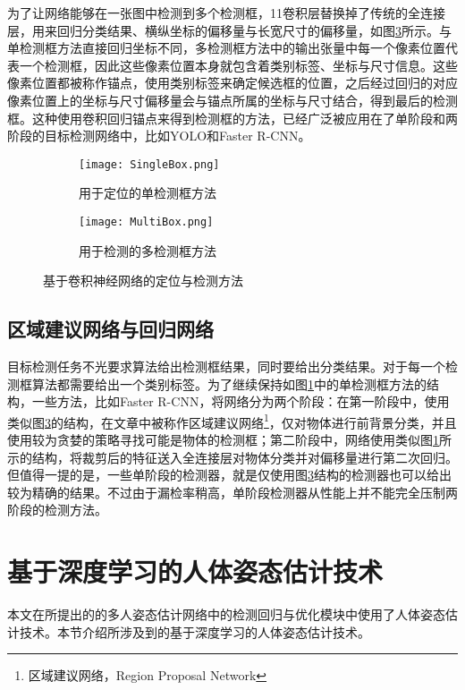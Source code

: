 为了让网络能够在一张图中检测到多个检测框，1\times1卷积层替换掉了传统的全连接层，用来回归分类结果、横纵坐标的偏移量与长宽尺寸的偏移量，如图\ref{fig:MultiBox}所示。与单检测框方法直接回归坐标不同，多检测框方法中的输出张量中每一个像素位置代表一个检测框，因此这些像素位置本身就包含着类别标签、坐标与尺寸信息。这些像素位置都被称作锚点，使用类别标签来确定候选框的位置，之后经过回归的对应像素位置上的坐标与尺寸偏移量会与锚点所属的坐标与尺寸结合，得到最后的检测框。这种使用卷积回归锚点来得到检测框的方法，已经广泛被应用在了单阶段和两阶段的目标检测网络中，比如YOLO\cite{redmon2016you}和Faster R-CNN\cite{Ren2015Faster}。

\begin{figure}[h]	
	\centering
	\begin{subfigure}[b]{0.3\textwidth}
		\texttt{[image: SingleBox.png]}
		\caption{用于定位的单检测框方法}
		\label{fig:SingleBox}
	\end{subfigure}
	\hskip1.5cm
	\begin{subfigure}[b]{0.3\textwidth}
		\texttt{[image: MultiBox.png]}
		\caption{用于检测的多检测框方法}
		\label{fig:MultiBox}
	\end{subfigure}
	\caption{基于卷积神经网络的定位与检测方法}
\end{figure}

\subsection{区域建议网络与回归网络}
\label{subsec:factsRPNregression}
目标检测任务不光要求算法给出检测框结果，同时要给出分类结果。对于每一个检测框算法都需要给出一个类别标签。为了继续保持如图\ref{fig:SingleBox}中的单检测框方法的结构，一些方法，比如Faster R-CNN\cite{Ren2015Faster}，将网络分为两个阶段：在第一阶段中，使用类似图\ref{fig:MultiBox}的结构，在文章中被称作区域建议网络\footnote{区域建议网络，Region Proposal Network}，仅对物体进行前背景分类，并且使用较为贪婪的策略寻找可能是物体的检测框；第二阶段中，网络使用类似图\ref{fig:SingleBox}所示的结构，将裁剪后的特征送入全连接层对物体分类并对偏移量进行第二次回归。但值得一提的是，一些单阶段的检测器，就是仅使用图\ref{fig:MultiBox}结构的检测器也可以给出较为精确的结果。不过由于漏检率稍高，单阶段检测器从性能上并不能完全压制两阶段的检测方法。

\section{基于深度学习的人体姿态估计技术}
\label{sec:factspose}
本文在所提出的的多人姿态估计网络中的检测回归与优化模块中使用了人体姿态估计技术。本节介绍所涉及到的基于深度学习的人体姿态估计技术。

